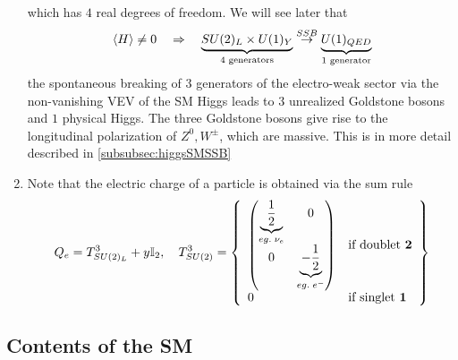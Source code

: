 \begin{enumerate}
\begin{equation}
	\end{equation}
	which has $4$ real degrees of freedom. We will see later that
	\begin{equation}
		\expval{H}\neq 0 \quad \Rightarrow \quad  \underbrace{SU(2)_L \times U(1)_Y}_{4 \text{ generators}}  \stackrel{SSB}{\rightarrow} \underbrace{U(1)_{QED}}_{1 \text{ generator}}
	\end{equation}
	the spontaneous breaking of $3$ generators of the electro-weak sector via the non-vanishing VEV of the SM Higgs leads to $3$ unrealized Goldstone bosons and $1$ physical Higgs. The three Goldstone bosons give rise to the longitudinal polarization of $Z^0, W^\pm$, which are massive. This is in more detail described in \ref{subsubsec:higgsSMSSB}
	\item Note that the electric charge of a particle is obtained via the sum rule
	\begin{equation}
		\label{eq:electricchargeSM}
		Q_{e} = T^3_{SU(2)_L} + y \mathbb{I}_2, \quad  T^3_{SU(2)}= \left\{\begin{array}{ll}
		\begin{pmatrix}
		\underbrace{\frac{1}{2}}_{eg. \; \nu_e} & 0 \\
		0 & \underbrace{- \frac{1}{2}}_{eg.\; e^-} \\
		\end{pmatrix}
		& \text{if doublet }\mathbf{2}\\
		0 & \text{if singlet }\mathbf{1}\\
		\end{array}	\right\} 
	\end{equation}
\end{enumerate}

 
 
 \subsection{Contents of the SM}
